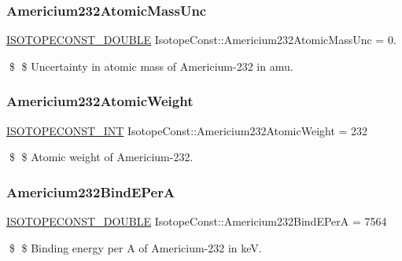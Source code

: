 \subsubsection{\texorpdfstring{Americium232\+Atomic\+Mass\+Unc}{Americium232AtomicMassUnc}}
{\footnotesize\ttfamily \mbox{\hyperlink{group___isotope_const-_macros_ga8f45a7272ce02c0b4c65c44636ed719a}{I\+S\+O\+T\+O\+P\+E\+C\+O\+N\+S\+T\+\_\+\+D\+O\+U\+B\+LE}} Isotope\+Const\+::\+Americium232\+Atomic\+Mass\+Unc = 0.}

\$ \$ Uncertainty in atomic mass of Americium-\/232 in amu. \mbox{\label{group___isotope_const-_americium-_am232_gaad69433565c916e8e92f40e0323d67fa}} 
\subsubsection{\texorpdfstring{Americium232\+Atomic\+Weight}{Americium232AtomicWeight}}
{\footnotesize\ttfamily \mbox{\hyperlink{group___isotope_const-_macros_ga5f18360b3e99483a35c32d789e62621c}{I\+S\+O\+T\+O\+P\+E\+C\+O\+N\+S\+T\+\_\+\+I\+NT}} Isotope\+Const\+::\+Americium232\+Atomic\+Weight = 232}

\$ \$ Atomic weight of Americium-\/232. \mbox{\label{group___isotope_const-_americium-_am232_ga7dd3bb3b5e32251d280a056569ca798c}} 
\subsubsection{\texorpdfstring{Americium232\+Bind\+E\+PerA}{Americium232BindEPerA}}
{\footnotesize\ttfamily \mbox{\hyperlink{group___isotope_const-_macros_ga8f45a7272ce02c0b4c65c44636ed719a}{I\+S\+O\+T\+O\+P\+E\+C\+O\+N\+S\+T\+\_\+\+D\+O\+U\+B\+LE}} Isotope\+Const\+::\+Americium232\+Bind\+E\+PerA = 7564}

\$ \$ Binding energy per A of Americium-\/232 in keV. \mbox{\label{group___isotope_const-_americium-_am232_gac6701e3f358d3d7538eec590bd9d462a}} 
